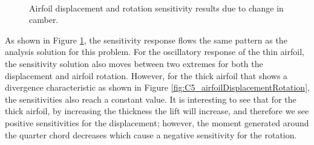 \begin{figure}[H]
    \centering
    \quad
    \\
    \quad
    \caption{Airfoil displacement and rotation sensitivity results due to change in camber.}
    \label{fig:C5_airfoilSensitivityTimeHistory}
\end{figure}
%
As shown in Figure \ref{fig:C5_airfoilSensitivityTimeHistory}, the sensitivity response flows the same pattern as the analysis solution for this problem. For the oscillatory response of the thin airfoil, the sensitivity solution also moves between two extremes for both the displacement and airfoil rotation. However, for the thick airfoil that shows a divergence characteristic as shown in Figure \ref{fig:C5_airfoilDisplacementRotation}, the sensitivities also reach a constant value. It is interesting to see that for the thick airfoil, by increasing the thickness the lift will increase, and therefore we see positive sensitivities for the displacement; however, the moment generated around the quarter chord decreases which cause a negative sensitivity for the rotation.

